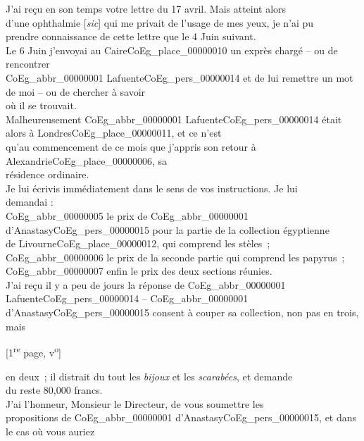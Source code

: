 \documentclass{book}
\begin{document}
J’ai reçu en son temps votre lettre du 17 avril. Mais atteint alors\\
d’une ophthalmie [\textit{sic}] qui me privait de l’usage de mes yeux, je n’ai pu\\
prendre connaissance de cette lettre que le 4 Juin suivant.\\
\indent Le 6 Juin j’envoyai au Caire\gls{CoEg_place_00000010} un exprès chargé – ou de rencontrer\\
\gls{CoEg_abbr_00000001} Lafuente\gls{CoEg_pers_00000014} et de lui remettre un mot de moi – ou de chercher à savoir\\
où il se trouvait.\\
\indent Malheureusement \gls{CoEg_abbr_00000001} Lafuente\gls{CoEg_pers_00000014} était alors à Londres\gls{CoEg_place_00000011}, et ce n’est\\
qu’au commencement de ce mois que j’appris son retour à Alexandrie\gls{CoEg_place_00000006}, sa\\
résidence ordinaire.\\
\indent Je lui écrivis immédiatement dans le sens de vos instructions. Je lui\\
demandai :\\
\indent \gls{CoEg_abbr_00000005} le prix de \gls{CoEg_abbr_00000001} d’Anastasy\gls{CoEg_pers_00000015} pour la partie de la collection égyptienne\\
de Livourne\gls{CoEg_place_00000012}, qui comprend les stèles~;\\
\indent \gls{CoEg_abbr_00000006} le prix de la seconde partie qui comprend les papyrus~;\\
\indent \gls{CoEg_abbr_00000007} enfin le prix des deux sections réunies.\\
\indent J’ai reçu il y a peu de jours la réponse de \gls{CoEg_abbr_00000001} Lafuente\gls{CoEg_pers_00000014} – \gls{CoEg_abbr_00000001}\\
d’Anastasy\gls{CoEg_pers_00000015} consent à couper sa collection, non pas en trois, mais
{\footnotesize \begin{center} [1\textsuperscript{re} page, v\textsuperscript{o}]\end{center}}
\noindent en deux~; il distrait du tout les \textit{bijoux} et les \textit{scarabées}, et demande\\
du reste 80,000 francs.\\
\indent J’ai l’honneur, Monsieur le Directeur, de vous soumettre les\\
propositions de \gls{CoEg_abbr_00000001} d’Anastasy\gls{CoEg_pers_00000015}, et dans le cas où vous auriez\\
\end{document}
